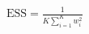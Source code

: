 \documentclass[border=4pt]{standalone}
\begin{document}
$\displaystyle \mathrm{ESS}=\frac{1}{K\sum_{i=1}^{K}w_i^2}$
\end{document}
